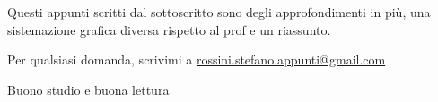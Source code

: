 Questi appunti scritti dal sottoscritto sono degli approfondimenti in più, una sistemazione 
grafica diversa rispetto al prof e un riassunto. \newline 

Per qualsiasi domanda, scrivimi a \href{mailto:rossini.stefano.appunti@gmail.com}{rossini.stefano.appunti@gmail.com} \newline

Buono studio e buona lettura \newline

\newpage 






